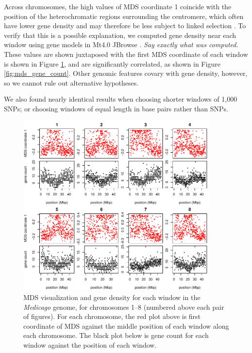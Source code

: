 \documentclass[11pt, oneside]{article}   	%
\newcommand{\plr}[1]{{\em \color{blue} #1}}
\begin{document}
Across chromosomes, the high values of MDS coordinate 1 coincide with the position of the heterochromatic regions surrounding the centromere,
which often have lower gene density and may therefore be less subject to linked selection \citep{kulikova2001integration,paape2013selection}. 
To verify that this is a possible explanation,
we computed gene density near each window using gene models in Mt4.0 JBrowse \citep{tang2014improved}. 
\plr{Say exactly what was computed.}
These values are shown juxtaposed with
the first MDS coordinate of each window is shown in Figure \ref{fig:mds_medicago},
and are significantly correlated, as shown in Figure \ref{fig:mds_gene_count}.
Other genomic features covary with gene density, however,
so we cannot rule out alternative hypotheses.

We also found nearly identical results when choosing shorter windows of 1,000 SNPs;
or choosing windows of equal length in base pairs rather than SNPs.

\begin{figure}
    \begin{center}
       \includegraphics[width=0.9\textwidth]{Fig5_MDS_and_gene_count_allchr}
    \end{center}
    \caption{
         MDS visualization and gene density for each window in the \textit{Medicago} genome,
         for chromosomes 1--8 (numbered above each pair of figures).
         For each chromosome, the red plot above is first coordinate of MDS against the middle position of each window along each chromosome. 
         The black plot below is gene count for each window against the position of each window.
         \label{fig:mds_medicago}
    }
\end{figure}
\end{document}
